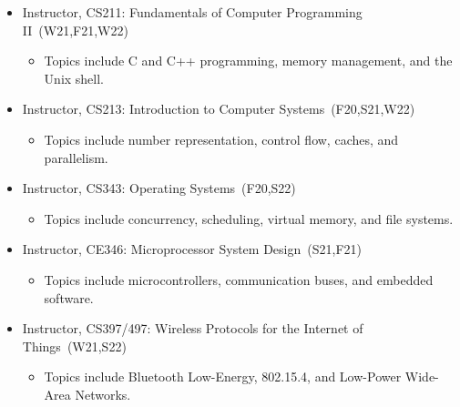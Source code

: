 \documentclass{article}
\begin{document}
\begin{itemize}
  \item[] Instructor, CS211: Fundamentals of Computer Programming II~(W21,F21,W22)
    \vspace{-\topsep}
    \vspace{\itemsep}
    \begin{itemize}
      \item Topics include C and C++ programming, memory management, and the Unix shell.
    \end{itemize}
  \item[] Instructor, CS213: Introduction to Computer Systems~(F20,S21,W22)
    \vspace{-\topsep}
    \vspace{\itemsep}
    \begin{itemize}
      \item Topics include number representation, control flow, caches, and parallelism.
    \end{itemize}
  \item[] Instructor, CS343: Operating Systems~(F20,S22)
    \vspace{-\topsep}
    \vspace{\itemsep}
    \begin{itemize}
      \item Topics include concurrency, scheduling, virtual memory, and file systems.
    \end{itemize}
  \item[] Instructor, CE346: Microprocessor System Design~(S21,F21)
    \vspace{-\topsep}
    \vspace{\itemsep}
    \begin{itemize}
      \item Topics include microcontrollers, communication buses, and embedded software.
    \end{itemize}
  \item[] Instructor, CS397/497: Wireless Protocols for the Internet of Things~(W21,S22)
    \vspace{-\topsep}
    \vspace{\itemsep}
    \begin{itemize}
      \item Topics include Bluetooth Low-Energy, 802.15.4, and Low-Power Wide-Area Networks.
    \end{itemize}
\end{itemize}
\end{document}
